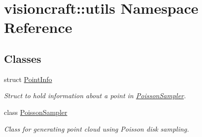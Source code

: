 \hypertarget{namespacevisioncraft_1_1utils}{}\section{visioncraft\+:\+:utils Namespace Reference}
\label{namespacevisioncraft_1_1utils}
\subsection*{Classes}
\begin{DoxyCompactItemize}
\item 
struct \hyperlink{structvisioncraft_1_1utils_1_1PointInfo}{Point\+Info}
\begin{DoxyCompactList}\small\item\em Struct to hold information about a point in \hyperlink{classvisioncraft_1_1utils_1_1PoissonSampler}{Poisson\+Sampler}. \end{DoxyCompactList}\item 
class \hyperlink{classvisioncraft_1_1utils_1_1PoissonSampler}{Poisson\+Sampler}
\begin{DoxyCompactList}\small\item\em Class for generating point cloud using Poisson disk sampling. \end{DoxyCompactList}\end{DoxyCompactItemize}
